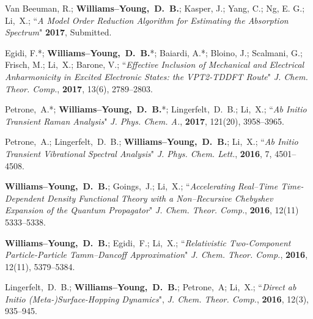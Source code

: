 \documentclass[10pt]{res} %
\newcommand*\me[0]{{\bf Williams--Young,~D.~B.}}
\newcommand*\xsli[0]{Li,~X.}
\begin{document}
\begin{resume}
\vspace{10pt} %
\begin{etaremune}
  \item Van Beeuman, R.; \me; Kasper, J.; Yang, C.; Ng, E. G.; \xsli;
        ``\emph{A Model Order Reduction Algorithm for Estimating the 
	        Absorption Spectrum}"
        \textbf{2017}, Submitted.
  \item Egidi, F.*; \me*; Baiardi, A.*; Bloino, J.; Scalmani, G.; Frisch, M.; 
        \xsli; Barone, V.; 
        ``\emph{Effective Inclusion of Mechanical and Electrical Anharmonicity in 
                Excited Electronic States: the VPT2-TDDFT Route}"
          \emph{J. Chem. Theor. Comp.}, \textbf{2017}, 13(6), 2789--2803.
  \item Petrone,~A.*; \me*; Lingerfelt,~D.~B.; \xsli;
        ``\emph{Ab Initio Transient Raman Analysis}"
	  \emph{J. Phys. Chem. A.}, \textbf{2017}, 121(20), 3958--3965.
  \item Petrone,~A.; Lingerfelt,~D.~B.; \me; \xsli;
        ``\emph{Ab Initio Transient Vibrational Spectral Analysis}"
	  \emph{J. Phys. Chem. Lett.}, \textbf{2016}, 7, 4501--4508.
  \item \me; Goings,~J.; \xsli;
	``\emph{Accelerating Real--Time Time-Dependent Density Functional Theory 
	        with a Non--Recursive Chebyshev Expansion of the Quantum 
                Propagator}"
	  \emph{J. Chem. Theor. Comp.}, \textbf{2016}, 12(11) 5333--5338.
  \item \me; Egidi,~F.; \xsli;
	``\emph{Relativistic Two-Component Particle-Particle Tamm--Dancoff 
	        Approximation}"
	  \emph{J. Chem. Theor. Comp.}, \textbf{2016}, 12(11), 5379--5384.
  \item Lingerfelt,~D.~B.; \me; Petrone,~A; \xsli; 
        ``\emph{Direct ab Initio (Meta-)Surface-Hopping Dynamics}", 
        \emph{J. Chem. Theor. Comp.}, \textbf{2016}, 12(3), 935--945.
\end{etaremune}
%


\end{resume}
\end{document}
